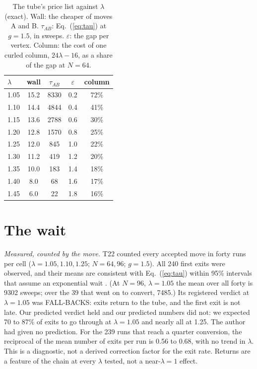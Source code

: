 \documentclass[aps,pre,10pt,twocolumn,superscriptaddress,nofootinbib]{revtex4-2}
\begin{document}
\begin{table}[b]
\caption{The tube's price list against $\lambda$ (exact). Wall: the cheaper of moves A and B. $\tau_{AB}$:
Eq.~(\ref{eq:tau}) at $g=1.5$, in sweeps. $\varepsilon$: the gap per vertex. Column: the cost of one curled
column, $24\lambda-16$, as a share of the gap at $N=64$.}
\label{tab:exact}
\begin{ruledtabular}
\begin{tabular}{lcccc}
$\lambda$ & wall & $\tau_{AB}$ & $\varepsilon$ & column \\
\hline
1.05 & 15.2 & 8330 & 0.2 & 72\% \\
1.10 & 14.4 & 4844 & 0.4 & 41\% \\
1.15 & 13.6 & 2788 & 0.6 & 30\% \\
1.20 & 12.8 & 1570 & 0.8 & 25\% \\
1.25 & 12.0 & 845 & 1.0 & 22\% \\
1.30 & 11.2 & 419 & 1.2 & 20\% \\
1.35 & 10.0 & 183 & 1.4 & 18\% \\
1.40 & 8.0 & 68 & 1.6 & 17\% \\
1.45 & 6.0 & 22 & 1.8 & 16\% \\
\end{tabular}
\end{ruledtabular}
\end{table}

\section{The wait}
\label{sec:wait}

\emph{Measured, counted by the move.} T22 counted every accepted move in forty runs per cell
($\lambda=1.05,1.10,1.25$; $N=64,96$; $g=1.5$). All 240 first exits were observed, and their means are consistent
with Eq.~(\ref{eq:tau}) within 95\% intervals that assume an exponential wait \cite{paper1}. (At $N=96$, $\lambda=1.05$ the mean
over all forty is 9302 sweeps; over the 39 that went on to convert, 7485.) Its registered verdict at
$\lambda=1.05$ was FALL-BACKS: exits return to the tube, and the first exit is not late. Our predicted verdict
held and our predicted numbers did not: we expected 70 to 87\% of exits to go through at $\lambda=1.05$ and nearly
all at 1.25. The author had given no prediction. For the 239 runs that reach a quarter conversion, the reciprocal
of the mean number of exits per run is 0.56 to 0.68, with no trend in $\lambda$. This is a diagnostic, not a
derived correction factor for the exit rate. Returns are a feature of the chain at every $\lambda$ tested, not a
near-$\lambda=1$ effect.
\end{document}
